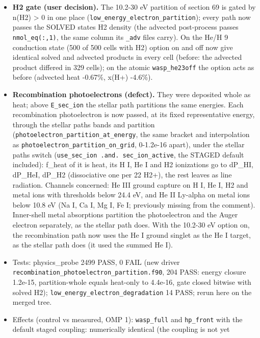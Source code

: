 \documentclass[english,a4paper]{my_memo}
\providecommand{\tightlist}{\setlength{\itemsep}{0pt}\setlength{\parskip}{0pt}}
\begin{document}
\begin{itemize}
\tightlist
\item
  \textbf{H2 gate (user decision).} The 10.2-30 eV partition of section 69 is
  gated by n(H2) \textgreater{} 0 in one place (\texttt{low\_energy\_electron\_partition}); every
  path now passes the SOLVED state\textquotesingle s H2 density (the advected post-process
  passes \texttt{nmol\_eq(:,1)}, the same column its \texttt{\_adv} files carry). On the
  He/H 9 conduction state (500 of 500 cells with H2) option on and off now
  give identical solved and advected products in every cell (before: the
  advected product differed in 329 cells); on the atomic \texttt{wasp\_he23off} the
  option acts as before (advected heat -0.67\%, x(H+) -4.6\%).
\item
  \textbf{Recombination photoelectrons (defect).} They were deposited whole as
  heat; above \texttt{E\_sec\_ion} the stellar path partitions the same energies.
  Each recombination photoelectron is now passed, at its fixed
  representative energy, through the stellar path\textquotesingle s bands and partition
  (\texttt{photoelectron\_partition\_at\_energy}, the same bracket and interpolation
  as \texttt{photoelectron\_partition\_on\_grid}, 0-1.2e-16 apart), under the
  stellar path\textquotesingle s switch (\texttt{use\_sec\_ion\ .and.\ sec\_ion\_active}, the STAGED
  default included): f\_heat of it is heat, its H I, He I and H2
  ionizations go to dP\_HI, dP\_HeI, dP\_H2 (dissociative one per 22 H2+),
  the rest leaves as line radiation. Channels concerned: He III ground
  capture on H I, He I, H2 and metal ions with thresholds below 24.4 eV,
  and He II Ly-alpha on metal ions below 10.8 eV (Na I, Ca I, Mg I, Fe I;
  previously missing from the comment). Inner-shell metal absorptions
  partition the photoelectron and the Auger electron separately, as the
  stellar path does. With the 10.2-30 eV option on, the recombination path
  now uses the He I ground singlet as the He I target, as the stellar path
  does (it used the summed He I).
\item
  Tests: physics\_probe 2499 PASS, 0 FAIL (new driver
  \texttt{recombination\_photoelectron\_partition.f90}, 204 PASS: energy closure
  1.2e-15, partition-whole equals heat-only to 4.4e-16, gate closed bitwise
  with solved H2); \texttt{low\_energy\_electron\_degradation} 14 PASS; rerun here on
  the merged tree.
\item
  Effects (control vs measured, OMP 1): \texttt{wasp\_full} and \texttt{hp\_front} with the
  default staged coupling: numerically identical (the coupling is not yet

\end{itemize}
\end{document}
